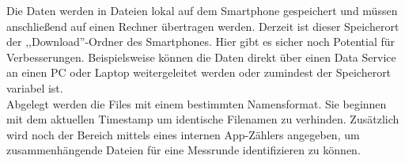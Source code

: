 Die Daten werden in Dateien lokal auf dem Smartphone gespeichert und müssen anschließend auf einen Rechner übertragen werden. Derzeit ist dieser Speicherort der ,,Download''-Ordner des Smartphones. Hier gibt es sicher noch Potential für Verbesserungen. Beispielsweise können die Daten direkt über einen Data Service an einen PC oder Laptop weitergeleitet werden oder zumindest der Speicherort variabel ist. \\
Abgelegt werden die Files mit einem bestimmten Namensformat. Sie beginnen mit dem aktuellen Timestamp um identische Filenamen zu verhinden. Zusätzlich wird noch der Bereich %
 mittels eines internen App-Zählers angegeben, um zusammenhängende Dateien für eine Messrunde identifizieren zu können.